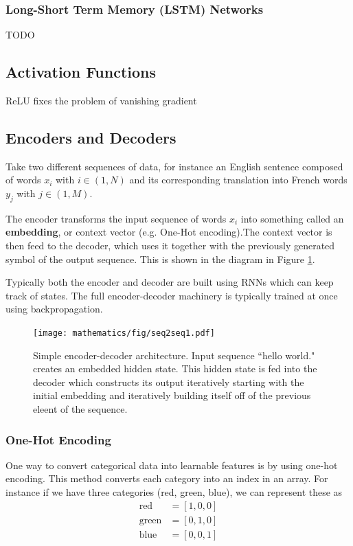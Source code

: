 \subsubsection{Long-Short Term Memory (LSTM) Networks}
TODO

\subsection{Activation Functions}
ReLU fixes the problem of vanishing gradient


\subsection{Encoders and Decoders}
Take two different sequences of data, for instance an English sentence composed of words $x_i$ with $i\in (1,N)$ and its corresponding translation into French words $y_j$ with $j\in(1,M)$.

The encoder transforms the input sequence of words $x_i$ into something called an \textbf{embedding}, or context vector (e.g. One-Hot encoding).The context vector is then feed to the decoder, which uses it together with the previously generated symbol of the output sequence. This is shown in the diagram in Figure \ref{fig:encoder-decoder}.

Typically both the encoder and decoder are built using RNNs which can keep track of states. The full encoder-decoder machinery is typically trained at once using backpropagation.

\begin{figure}
\centerline{\texttt{[image: mathematics/fig/seq2seq1.pdf]}}
\label{fig:encoder-decoder}
\caption{Simple encoder-decoder architecture. Input sequence ``hello world." creates an embedded hidden state. This hidden state is fed into the decoder which constructs its output iteratively starting with the initial embedding and iteratively building itself off of the previous eleent of the sequence. \cite{zhang}}
\end{figure}


\subsubsection{One-Hot Encoding}
One way to convert categorical data into learnable features is by using one-hot encoding. This method converts each category into an index in an array. For instance if we have three categories (red, green, blue), we can represent these as
\begin{align}
    \textrm{red} &= [1,0,0]\\
    \textrm{green} &= [0,1,0]\\
    \textrm{blue} &= [0,0,1]
\end{align}

